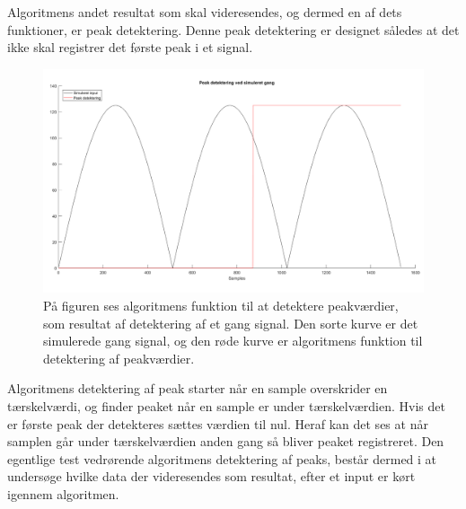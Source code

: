 Algoritmens andet resultat som skal videresendes, og dermed en af dets funktioner, er peak detektering. Denne peak detektering er designet således at det ikke skal registrer det første peak i et signal.
\begin{figure}[H]
	\centering
	\includegraphics[scale=0.3]{figures/cDesign/test_peak_gang.png}
	\caption{På figuren ses algoritmens funktion til at detektere peakværdier, som resultat af detektering af et gang signal. Den sorte kurve er det simulerede gang signal, og den røde kurve er algoritmens funktion til detektering af peakværdier.}
	\label{fig:test_peak_gang}
\end{figure}
Algoritmens detektering af peak starter når en sample overskrider en tærskelværdi, og finder peaket når en sample er under tærskelværdien. Hvis det er første peak der detekteres sættes værdien til nul. Heraf kan det ses at når samplen går under tærskelværdien anden gang så bliver peaket registreret. Den egentlige test vedrørende algoritmens detektering af peaks, består dermed i at undersøge hvilke data der videresendes som resultat, efter et input er kørt igennem algoritmen.

